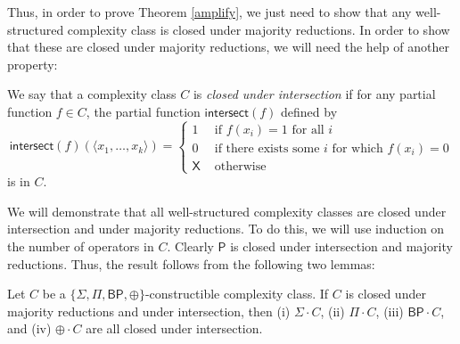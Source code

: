\documentclass[11pt]{article}
\newcommand{\bp}{\textsf{BP}}
\newcommand{\parity}{\oplus}
\newcommand{\p}{\textsf{P}}
\newcommand{\x}{\textsf{X}}
\newcommand{\intersection}{\textsf{intersect}}
\newcommand{\intersect}{\textsf{intersect}}
\begin{document}
Thus, in order to prove Theorem \ref{amplify}, we just need to show that any well-structured complexity class is closed under majority reductions. In order to show that these are closed under majority reductions, we will need the help of another property:
\begin{definition}\label{defintersection}
We say that a complexity class $C$ is \emph{closed under intersection} if for any partial function $f \in C$, the partial function $\intersect(f)$ defined by
$$\intersect(f)(\langle x_1, \ldots, x_k\rangle) = 
\begin{cases}1 & \text{ if $f(x_i) = 1$ for all $i$} \\
0 & \text{ if there exists some $i$ for which $f(x_i) = 0$}\\
\x & \text{ otherwise}
\end{cases}$$
is in $C$.
\end{definition}
We will demonstrate that all well-structured complexity classes are closed under intersection and under majority reductions. To do this, we will use induction on the number of operators in $C$. Clearly $\p$ is closed under intersection and majority reductions. Thus, the result follows from the following two lemmas:

\begin{lemma}\label{intersectionlemma}
Let $C$ be a \emph{$\{\Sigma,\Pi,\bp,\parity\}$}-constructible complexity class. If $C$ is closed under majority reductions and under intersection, then (i) \emph{$\Sigma \cdot C$}, (ii) \emph{$\Pi \cdot C$}, (iii) \emph{$\bp \cdot C$}, and (iv) \emph{$\parity \cdot C$} are all closed under intersection.
\end{lemma}
\end{document}
